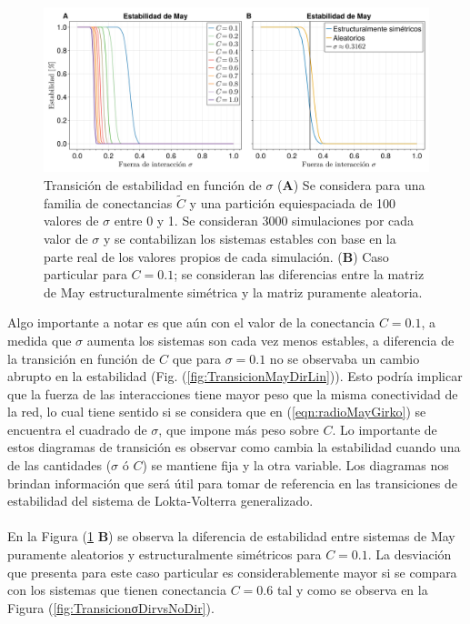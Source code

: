 \begin{figure}[h!]
	\centering
	\includegraphics[scale = 0.165]{../Imagenes/TransicionMaySigma}
	\caption{Transición de estabilidad en función de $\sigma$ (\textbf{A}) Se considera para una familia de conectancias $\tilde{C}$ y una partición equiespaciada de 100 valores de $\sigma$ entre 0 y 1. Se consideran 3000 simulaciones por cada valor de $\sigma$ y se contabilizan los sistemas estables con base en la parte real de los valores propios de cada simulación. (\textbf{B}) Caso particular para $C=0.1$; se consideran las diferencias entre la matriz de May estructuralmente simétrica y la matriz puramente aleatoria.}
	\label{fig:TransicionMaySigma}
\end{figure}
Algo importante a notar es que aún con el valor de la conectancia $C=0.1$, a medida que $\sigma$ aumenta los sistemas son cada vez menos estables, a diferencia de la transición en función de $C$ que para $\sigma=0.1$ no se observaba un cambio abrupto en la estabilidad (Fig. (\ref{fig:TransicionMayDirLin})). Esto podría implicar que la fuerza de las interacciones tiene mayor peso que la misma conectividad de la red, lo cual tiene sentido si se considera que en (\ref{eqn:radioMayGirko}) se encuentra el cuadrado de $\sigma$, que impone más peso sobre $C$. Lo importante de estos diagramas de transición es observar como cambia la estabilidad cuando una de las cantidades ($\sigma$ ó $C$) se mantiene fija y la otra variable. Los diagramas nos brindan información que será útil para tomar de referencia en las transiciones de estabilidad del sistema de Lokta-Volterra generalizado.\\
\\
En la Figura (\ref{fig:TransicionMaySigma} \textbf{B}) se observa la diferencia de estabilidad entre sistemas de May puramente aleatorios y estructuralmente simétricos para $C=0.1$. La desviación que presenta para este caso particular es considerablemente mayor si se compara con los sistemas que tienen conectancia $C=0.6$ tal y como se observa en la Figura (\ref{fig:TransicionσDirvsNoDir}).
